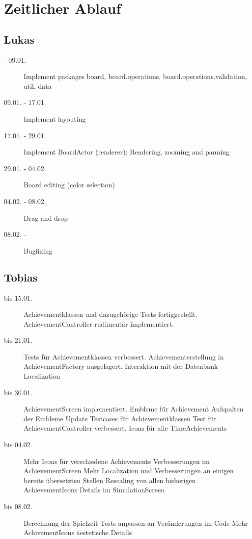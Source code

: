 \chapter{Zeitlicher Ablauf}

\section{Lukas}
\begin{description}
\item[ - 09.01.]
Implement packages board, board.operations, board.operations.validation, util, data
\item[09.01. - 17.01.]
Implement layouting
\item[17.01. - 29.01.]
Implement BoardActor (renderer): Rendering, zooming and panning
\item[29.01. - 04.02.]
Board editing (color selection)
\item[04.02. - 08.02.]
Drag and drop
\item[08.02. - ]
Bugfixing
\end{description}

\section{Tobias}
\begin{description}
\item[bis 15.01.]
Achievementklassen und dazugehörige Tests fertiggestellt.
AchievementController rudimentär implementiert.
\item[bis 21.01.]
Tests für Achievementklassen verbessert.
Achievementerstellung in AchievementFactory ausgelagert.
Interaktion mit der Datenbank
Localization
\item[bis 30.01.]
AchievementScreen implementiert.
Embleme für Achievement
Aufspalten der Embleme
Update Testcases für Achievementklassen
Test für AchievementController verbessert.
Icons für alle TimeAchievements
\item[bis 04.02.]
Mehr Icons für verschiedene Achievements
Verbesserungen im AchievementScreen
Mehr Localization und Verbesserungen an einigen bereits übersetzten Stellen
Rescaling von allen bisherigen AchievementIcons
Details im SimulationScreen
\item[bis 08.02.]
Berechnung der Spielzeit
Tests anpassen an Veränderungen im Code
Mehr AchivementIcons
äestetische Details
\end{description}

